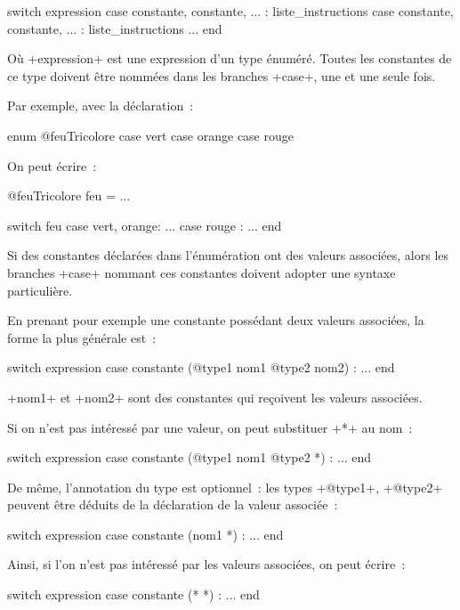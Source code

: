 \begin{galgas4}
switch expression
case constante, constante, ... :
  liste_instructions
case constante, constante, ... :
  liste_instructions
...
end
\end{galgas4}


Où \ggsq+expression+ est une expression d'un type énuméré. Toutes les constantes de ce type doivent être nommées dans les branches \ggsq+case+, une et une seule fois.

Par exemple, avec la déclaration~:

\begin{galgas4}
enum @feuTricolore {
  case vert
  case orange
  case rouge
}
\end{galgas4}

On peut écrire~:

\begin{galgas4}
@feuTricolore feu = ...

switch feu
case vert, orange:
  ...
case rouge :
  ...
end
\end{galgas4}

Si des constantes déclarées dans l'énumération ont des valeurs associées, alors les branches \ggsq+case+ nommant ces constantes doivent adopter une syntaxe particulière.

En prenant pour exemple une constante possédant deux valeurs associées, la forme la plus générale est~:

\begin{galgas4}
switch expression
case constante (@type1 nom1 @type2 nom2) :
...
end
\end{galgas4}

\ggsq+nom1+ et \ggsq+nom2+ sont des constantes qui reçoivent les valeurs associées.

Si on n'est pas intéressé par une valeur, on peut substituer \ggsq+*+ au nom~:

\begin{galgas4}
switch expression
case constante (@type1 nom1 @type2 *) :
...
end
\end{galgas4}

De même, l'annotation du type est optionnel~: les types \ggsq+@type1+, \ggsq+@type2+ peuvent être déduits de la déclaration de la valeur associée~:

\begin{galgas4}
switch expression
case constante (nom1 *) :
...
end
\end{galgas4}

Ainsi, si l'on n'est pas intéressé par les valeurs associées, on peut écrire~:
\begin{galgas4}
switch expression
case constante (* *) :
...
end
\end{galgas4}

